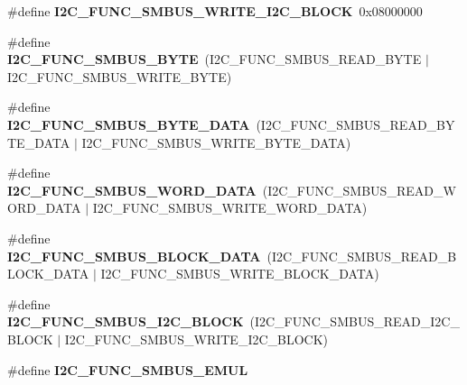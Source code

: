 \begin{DoxyCompactItemize}
\mbox{\label{group__I2CLinux_ga87990a457cb6785821f82eddd5bda85e}} 
\#define {\bfseries I2\+C\+\_\+\+F\+U\+N\+C\+\_\+\+S\+M\+B\+U\+S\+\_\+\+W\+R\+I\+T\+E\+\_\+\+I2\+C\+\_\+\+B\+L\+O\+CK}~0x08000000
\item 
\mbox{\label{group__I2CLinux_ga0e940355fb6532a740e57aece17c670c}} 
\#define {\bfseries I2\+C\+\_\+\+F\+U\+N\+C\+\_\+\+S\+M\+B\+U\+S\+\_\+\+B\+Y\+TE}~(I2\+C\+\_\+\+F\+U\+N\+C\+\_\+\+S\+M\+B\+U\+S\+\_\+\+R\+E\+A\+D\+\_\+\+B\+Y\+TE $\vert$ I2\+C\+\_\+\+F\+U\+N\+C\+\_\+\+S\+M\+B\+U\+S\+\_\+\+W\+R\+I\+T\+E\+\_\+\+B\+Y\+TE)
\item 
\mbox{\label{group__I2CLinux_ga3d09bc1b4dfbf7336abf83e477419b90}} 
\#define {\bfseries I2\+C\+\_\+\+F\+U\+N\+C\+\_\+\+S\+M\+B\+U\+S\+\_\+\+B\+Y\+T\+E\+\_\+\+D\+A\+TA}~(I2\+C\+\_\+\+F\+U\+N\+C\+\_\+\+S\+M\+B\+U\+S\+\_\+\+R\+E\+A\+D\+\_\+\+B\+Y\+T\+E\+\_\+\+D\+A\+TA $\vert$ I2\+C\+\_\+\+F\+U\+N\+C\+\_\+\+S\+M\+B\+U\+S\+\_\+\+W\+R\+I\+T\+E\+\_\+\+B\+Y\+T\+E\+\_\+\+D\+A\+TA)
\item 
\mbox{\label{group__I2CLinux_ga1448936de71a0846193adbde34900948}} 
\#define {\bfseries I2\+C\+\_\+\+F\+U\+N\+C\+\_\+\+S\+M\+B\+U\+S\+\_\+\+W\+O\+R\+D\+\_\+\+D\+A\+TA}~(I2\+C\+\_\+\+F\+U\+N\+C\+\_\+\+S\+M\+B\+U\+S\+\_\+\+R\+E\+A\+D\+\_\+\+W\+O\+R\+D\+\_\+\+D\+A\+TA $\vert$ I2\+C\+\_\+\+F\+U\+N\+C\+\_\+\+S\+M\+B\+U\+S\+\_\+\+W\+R\+I\+T\+E\+\_\+\+W\+O\+R\+D\+\_\+\+D\+A\+TA)
\item 
\mbox{\label{group__I2CLinux_gaef52b94d71c11d2849c6f3ae62d0e29b}} 
\#define {\bfseries I2\+C\+\_\+\+F\+U\+N\+C\+\_\+\+S\+M\+B\+U\+S\+\_\+\+B\+L\+O\+C\+K\+\_\+\+D\+A\+TA}~(I2\+C\+\_\+\+F\+U\+N\+C\+\_\+\+S\+M\+B\+U\+S\+\_\+\+R\+E\+A\+D\+\_\+\+B\+L\+O\+C\+K\+\_\+\+D\+A\+TA $\vert$ I2\+C\+\_\+\+F\+U\+N\+C\+\_\+\+S\+M\+B\+U\+S\+\_\+\+W\+R\+I\+T\+E\+\_\+\+B\+L\+O\+C\+K\+\_\+\+D\+A\+TA)
\item 
\mbox{\label{group__I2CLinux_gad94ca1f256004b790c2feb762ff963e7}} 
\#define {\bfseries I2\+C\+\_\+\+F\+U\+N\+C\+\_\+\+S\+M\+B\+U\+S\+\_\+\+I2\+C\+\_\+\+B\+L\+O\+CK}~(I2\+C\+\_\+\+F\+U\+N\+C\+\_\+\+S\+M\+B\+U\+S\+\_\+\+R\+E\+A\+D\+\_\+\+I2\+C\+\_\+\+B\+L\+O\+CK $\vert$ I2\+C\+\_\+\+F\+U\+N\+C\+\_\+\+S\+M\+B\+U\+S\+\_\+\+W\+R\+I\+T\+E\+\_\+\+I2\+C\+\_\+\+B\+L\+O\+CK)
\item 
\#define {\bfseries I2\+C\+\_\+\+F\+U\+N\+C\+\_\+\+S\+M\+B\+U\+S\+\_\+\+E\+M\+UL}
\end{DoxyCompactItemize}
